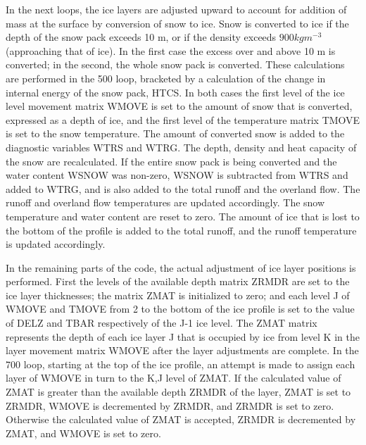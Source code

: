 In the next loops, the ice layers are adjusted upward to account for addition of mass at the surface by conversion of snow to ice. Snow is converted to ice if the depth of the snow pack exceeds 10 m, or if the density exceeds $900 kg m^{-3}$ (approaching that of ice). In the first case the excess over and above 10 m is converted; in the second, the whole snow pack is converted. These calculations are performed in the 500 loop, bracketed by a calculation of the change in internal energy of the snow pack, H\+T\+C\+S. In both cases the first level of the ice level movement matrix W\+M\+O\+V\+E is set to the amount of snow that is converted, expressed as a depth of ice, and the first level of the temperature matrix T\+M\+O\+V\+E is set to the snow temperature. The amount of converted snow is added to the diagnostic variables W\+T\+R\+S and W\+T\+R\+G. The depth, density and heat capacity of the snow are recalculated. If the entire snow pack is being converted and the water content W\+S\+N\+O\+W was non-\/zero, W\+S\+N\+O\+W is subtracted from W\+T\+R\+S and added to W\+T\+R\+G, and is also added to the total runoff and the overland flow. The runoff and overland flow temperatures are updated accordingly. The snow temperature and water content are reset to zero. The amount of ice that is lost to the bottom of the profile is added to the total runoff, and the runoff temperature is updated accordingly.

In the remaining parts of the code, the actual adjustment of ice layer positions is performed. First the levels of the available depth matrix Z\+R\+M\+D\+R are set to the ice layer thicknesses; the matrix Z\+M\+A\+T is initialized to zero; and each level J of W\+M\+O\+V\+E and T\+M\+O\+V\+E from 2 to the bottom of the ice profile is set to the value of D\+E\+L\+Z and T\+B\+A\+R respectively of the J-\/1 ice level. The Z\+M\+A\+T matrix represents the depth of each ice layer J that is occupied by ice from level K in the layer movement matrix W\+M\+O\+V\+E after the layer adjustments are complete. In the 700 loop, starting at the top of the ice profile, an attempt is made to assign each layer of W\+M\+O\+V\+E in turn to the K,J level of Z\+M\+A\+T. If the calculated value of Z\+M\+A\+T is greater than the available depth Z\+R\+M\+D\+R of the layer, Z\+M\+A\+T is set to Z\+R\+M\+D\+R, W\+M\+O\+V\+E is decremented by Z\+R\+M\+D\+R, and Z\+R\+M\+D\+R is set to zero. Otherwise the calculated value of Z\+M\+A\+T is accepted, Z\+R\+M\+D\+R is decremented by Z\+M\+A\+T, and W\+M\+O\+V\+E is set to zero.

